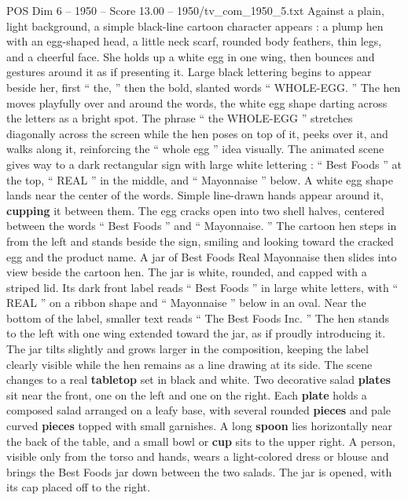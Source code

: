 \begin{textsample}{POS Dim 6 – 1950 – Score 13.00 – 1950/tv\_com\_1950\_5.txt}  \label{ex:f6_pos_014}
Against a plain, light background, a simple black-line cartoon character appears : a plump hen with an egg-shaped head, a little neck scarf, rounded body feathers, thin legs, and a cheerful face.
She holds up a white egg in one wing, then bounces and gestures around it as if presenting it.
Large black lettering begins to appear beside her, first “ the, ” then the bold, slanted words “ WHOLE-EGG. ” The hen moves playfully over and around the words, the white egg shape darting across the letters as a bright spot.
The phrase “ the WHOLE-EGG ” stretches diagonally across the screen while the hen poses on top of it, peeks over it, and walks along it, reinforcing the “ whole egg ” idea visually.
The animated scene gives way to a dark rectangular sign with large white lettering : “ Best Foods ” at the top, “ REAL ” in the middle, and “ Mayonnaise ” below.
A white egg shape lands near the center of the words.
Simple line-drawn hands appear around it, \textbf{cupping} it between them.
The egg cracks open into two shell halves, centered between the words “ Best Foods ” and “ Mayonnaise. ” The cartoon hen steps in from the left and stands beside the sign, smiling and looking toward the cracked egg and the product name.
A jar of Best Foods Real Mayonnaise then slides into view beside the cartoon hen.
The jar is white, rounded, and capped with a striped lid.
Its dark front label reads “ Best Foods ” in large white letters, with “ REAL ” on a ribbon shape and “ Mayonnaise ” below in an oval.
Near the bottom of the label, smaller text reads “ The Best Foods Inc. ” The hen stands to the left with one wing extended toward the jar, as if proudly introducing it.
The jar tilts slightly and grows larger in the composition, keeping the label clearly visible while the hen remains as a line drawing at its side.
The scene changes to a real \textbf{tabletop} set in black and white.
Two decorative salad \textbf{plates} sit near the front, one on the left and one on the right.
Each \textbf{plate} holds a composed salad arranged on a leafy base, with several rounded \textbf{pieces} and pale curved \textbf{pieces} topped with small garnishes.
A long \textbf{spoon} lies horizontally near the back of the table, and a small bowl or \textbf{cup} sits to the upper right.
A person, visible only from the torso and hands, wears a light-colored dress or blouse and brings the Best Foods jar down between the two salads.
The jar is opened, with its cap placed off to the right.

\end{textsample}
